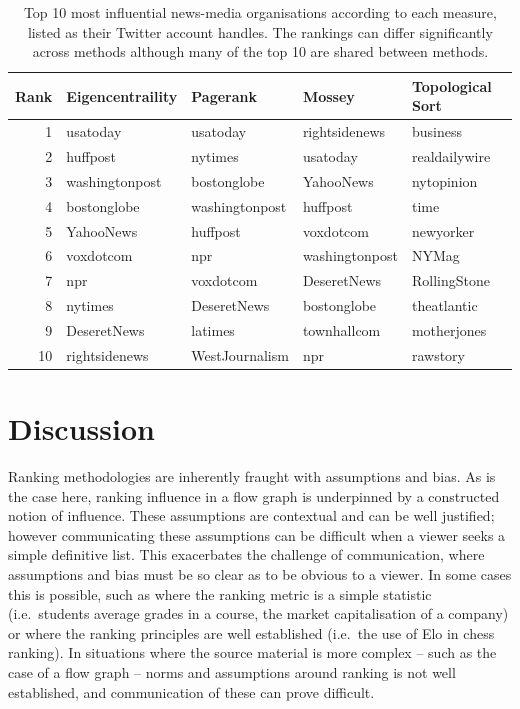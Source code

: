 \begin{table}[!htbp]
\centering
\begin{tabular}{rlllll}
\toprule
Rank &  Eigencentraility & Pagerank &  Mossey & Topological Sort \\
\midrule
1  &        usatoday &        usatoday &   rightsidenews &       business \\
2  &        huffpost &         nytimes &        usatoday &  realdailywire \\
3  &  washingtonpost &     bostonglobe &       YahooNews &     nytopinion \\
4  &     bostonglobe &  washingtonpost &        huffpost &           time \\
5  &       YahooNews &        huffpost &       voxdotcom &      newyorker \\
6  &       voxdotcom &             npr &  washingtonpost &          NYMag \\
7  &             npr &       voxdotcom &     DeseretNews &   RollingStone \\
8  &         nytimes &     DeseretNews &     bostonglobe &    theatlantic \\
9  &     DeseretNews &         latimes &     townhallcom &    motherjones \\
10 &   rightsidenews &  WestJournalism &             npr &       rawstory \\
\bottomrule
\end{tabular}
\caption{Top 10 most influential news-media organisations according to each measure, listed as their Twitter account handles. The rankings can differ significantly across methods although many of the top 10 are shared between methods.}\label{tab:ranking_top10}
\end{table}

\section{Discussion}

Ranking methodologies are inherently fraught with assumptions and bias. As is the case here, ranking influence in a flow graph is underpinned by a constructed notion of influence. These assumptions are contextual and can be well justified; however communicating these assumptions can be difficult when a viewer seeks a simple definitive list. This exacerbates the challenge of communication, where assumptions and bias must be so clear as to be obvious to a viewer. In some cases this is possible, such as where the ranking metric is a simple statistic (i.e.\ students average grades in a course, the market capitalisation of a company) or where the ranking principles are well established (i.e.\ the use of Elo in chess ranking). In situations where the source material is more complex -- such as the case of a flow graph -- norms and assumptions around ranking is not well established, and communication of these can prove difficult.

